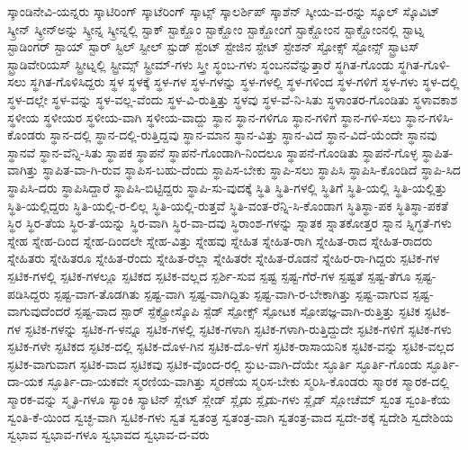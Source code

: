 {ಸ್ಕಾಂಡಿನೇವಿ-ಯನ್ನರು
ಸ್ಕಾಟಿರಿಂಗ್
ಸ್ಕಾಟೆರಿಂಗ್
ಸ್ಕಾಟ್ಸ್
ಸ್ಕಾಲರ್ಶಿಪ್
ಸ್ಕಾಶೆನ್
ಸ್ಕೀಯ-ವ-ರನ್ನು
ಸ್ಕೂಲ್
ಸ್ಕೊವಿಟ್
ಸ್ಕ್ರೀನ್
ಸ್ಕ್ರೀನ್ಅನ್ನು
ಸ್ಕ್ರೀನ್ನ
ಸ್ಕ್ರೀನ್ನಲ್ಲಿ
ಸ್ಟಾಕ್
ಸ್ಟಾಕ್ಹೊಂ
ಸ್ಟಾಕ್ಹೋಂ
ಸ್ಟಾಕ್ಹೋಂಗೆ
ಸ್ಟಾಕ್ಹೋಂನ
ಸ್ಟಾಕ್ಹೋಂನಲ್ಲಿ
ಸ್ಟಾಟ್ನ
ಸ್ಟಾಡಿಂಗರ್
ಸ್ಟಾಯ್
ಸ್ಟಾರ್
ಸ್ಟಿಲ್
ಸ್ಟೀಲ್
ಸ್ಟುಡ್
ಸ್ಟೆಂಟ್
ಸ್ಟೇಜಿನ
ಸ್ಟೇಟ್
ಸ್ಟೇಶನ್
ಸ್ಟೋಕ್ಸ್
ಸ್ಟೋನ್ಸ್
ಸ್ಟ್ರಾಟಸ್
ಸ್ಟ್ರಾಡಿವೇರಿಯಸ್
ಸ್ಟ್ರೀಟ್ನಲ್ಲಿ
ಸ್ಟ್ರೀಮ್ಸ್
ಸ್ಟ್ರೀಮ್-ಗಳು
ಸ್ತ್ರೀ
ಸ್ಥಂಬ-ಗಳು
ಸ್ಥಂಬನವೆನ್ನುತ್ತಾರೆ
ಸ್ಥಗಿತ-ಗೊಂಡು
ಸ್ಥಗಿತ-ಗೊಳಿ-ಸಲು
ಸ್ಥಗಿತ-ಗೊಳಿಸಿದ್ದರು
ಸ್ಥಳ
ಸ್ಥಳಕ್ಕೆ
ಸ್ಥಳ-ಗಳ
ಸ್ಥಳ-ಗಳನ್ನು
ಸ್ಥಳ-ಗಳಲ್ಲಿ
ಸ್ಥಳ-ಗಳಿಂದ
ಸ್ಥಳ-ಗಳಿಗೆ
ಸ್ಥಳ-ಗಳು
ಸ್ಥಳ-ದಲ್ಲಿ
ಸ್ಥಳ-ದಲ್ಲೇ
ಸ್ಥಳ-ವನ್ನು
ಸ್ಥಳ-ವಲ್ಲ-ವೆಂದು
ಸ್ಥಳ-ವಿ-ರುತ್ತಿತ್ತು
ಸ್ಥಳವು
ಸ್ಥಳ-ವೆ-ನಿ-ಸಿತು
ಸ್ಥಳಾಂತರ-ಗೊಂಡಿತು
ಸ್ಥಳಾವಕಾಶ
ಸ್ಥಳೀಯ
ಸ್ಥಳೀಯರ
ಸ್ಥಳೀಯ-ವಾಗಿ
ಸ್ಥಳೀಯ-ವಾದ್ದು
ಸ್ಥಾನ
ಸ್ಥಾನ-ಗಳಿಗೂ
ಸ್ಥಾನ-ಗಳಿಗೆ
ಸ್ಥಾನ-ಗಳಿ-ಸಲು
ಸ್ಥಾನ-ಗಳಿಸಿ-ಕೊಂಡರು
ಸ್ಥಾನ-ದಲ್ಲಿ
ಸ್ಥಾನ-ದಲ್ಲಿ-ರುತ್ತಿದ್ದವು
ಸ್ಥಾನ-ಮಾನ
ಸ್ಥಾನ-ವಿತ್ತು
ಸ್ಥಾನ-ವಿದೆ
ಸ್ಥಾನ-ವಿದೆ-ಯೆಂದೇ
ಸ್ಥಾನವು
ಸ್ಥಾನವೆ
ಸ್ಥಾನ-ವೆನ್ನಿ-ಸಿತು
ಸ್ಥಾಪಕ
ಸ್ಥಾಪನೆ
ಸ್ಥಾಪನೆ-ಗೊಂಡಾಗಿ-ನಿಂದಲೂ
ಸ್ಥಾಪನೆ-ಗೊಂಡಿತು
ಸ್ಥಾಪನೆ-ಗೊಳ್ಳ
ಸ್ಥಾಪಿತ-ವಾಗಿತ್ತು
ಸ್ಥಾಪಿತ-ವಾ-ಗಿ-ರುವ
ಸ್ಥಾಪಿಸ-ಬಹು-ದೆಂದು
ಸ್ಥಾಪಿಸ-ಬೇಕು
ಸ್ಥಾಪಿ-ಸಲು
ಸ್ಥಾಪಿಸಿ
ಸ್ಥಾಪಿಸಿ-ಕೊಂಡಿದೆ
ಸ್ಥಾಪಿ-ಸಿದ
ಸ್ಥಾಪಿಸಿ-ದರು
ಸ್ಥಾಪಿಸಿದ್ದಾರೆ
ಸ್ಥಾಪಿಸಿ-ಬಿಟ್ಟಿದ್ದರು
ಸ್ಥಾಪಿ-ಸು-ವುದಕ್ಕೆ
ಸ್ಥಿತಿ
ಸ್ಥಿತಿ-ಗಳಲ್ಲಿ
ಸ್ಥಿತಿಗೆ
ಸ್ಥಿತಿ-ಯಲ್ಲಿ
ಸ್ಥಿತಿ-ಯಲ್ಲಿತ್ತು
ಸ್ಥಿತಿ-ಯಲ್ಲಿದ್ದರು
ಸ್ಥಿತಿ-ಯಲ್ಲಿ-ರ-ಲಿಲ್ಲ
ಸ್ಥಿತಿ-ಯಲ್ಲಿ-ರುತ್ತವೆ
ಸ್ಥಿತಿ-ವಂತ-ರೆನ್ನಿ-ಸಿ-ಕೊಂಡಾಗ
ಸ್ಥಿತಿಸ್ಥಾ-ಪಕ
ಸ್ಥಿತಿಸ್ಥಾ-ಪಕತೆ
ಸ್ಥಿರ
ಸ್ಥಿರ-ತೆಯ
ಸ್ಥಿರ-ತೆ-ಯನ್ನು
ಸ್ಥಿರ-ವಾಗಿ
ಸ್ಥಿರ-ವಾ-ದವು
ಸ್ಥಿರಾಂಶ-ಗಳನ್ನು
ಸ್ನಾತಕ
ಸ್ನಾತಕೋತ್ತರ
ಸ್ನಾನ
ಸ್ನಿಗ್ಧತೆ-ಗಳು
ಸ್ನೇಹ
ಸ್ನೇಹ-ದಿಂದ
ಸ್ನೇಹ-ದಿಂದಲೇ
ಸ್ನೇಹ-ವಿತ್ತು
ಸ್ನೇಹವು
ಸ್ನೇಹಿತ
ಸ್ನೇಹಿತ-ರಾಗಿ
ಸ್ನೇಹಿತ-ರಾದ
ಸ್ನೇಹಿತ-ರಾದರು
ಸ್ನೇಹಿತರು
ಸ್ನೇಹಿತರೂ
ಸ್ನೇಹಿತ-ರೆಂದು
ಸ್ನೇಹಿತ-ರೆಲ್ಲಾ
ಸ್ನೇಹಿತರೇ
ಸ್ನೇಹಿತ-ರೊಡನೆ
ಸ್ನೇಹಿರ-ರಾ-ಗಿದ್ದರು
ಸ್ಪಟಿಕ-ಗಳ
ಸ್ಪಟಿಕ-ಗಳಲ್ಲಿ
ಸ್ಪಟಿಕ-ಗಳಲ್ಲೂ
ಸ್ಪಟಿಕದ
ಸ್ಪಟಿಕ-ವಲ್ಲದ
ಸ್ಪರ್ಶಿ-ಸುವ
ಸ್ಪಷ್ಟ
ಸ್ಪಷ್ಟ-ಗೆರೆ-ಗಳ
ಸ್ಪಷ್ಟತೆ
ಸ್ಪಷ್ಟ-ತೆಗೂ
ಸ್ಪಷ್ಟ-ಪಡಿಸಿದ್ದರು
ಸ್ಪಷ್ಟ-ವಾಗ-ತೊಡಗಿತು
ಸ್ಪಷ್ಟ-ವಾಗಿ
ಸ್ಪಷ್ಟ-ವಾಗಿದ್ದಿತು
ಸ್ಪಷ್ಟ-ವಾಗಿ-ರ-ಬೇಕಾಗಿತ್ತು
ಸ್ಪಷ್ಟ-ವಾಗುವ
ಸ್ಪಷ್ಟ-ವಾಗುವುದೆಂದರೆ
ಸ್ಪಷ್ಟ-ವಾದ
ಸ್ಪಾರ್
ಸ್ಪೆಕ್ಟ್ರೋಸ್ಕೊಪಿ
ಸ್ಪೆಡ್
ಸ್ಪೋಕ್ಸ್
ಸ್ಪೋಟಕ
ಸ್ಪೋಪಜ್ಞ-ವಾಗಿ-ರುತ್ತಿತ್ತು
ಸ್ಫಟಿಕ
ಸ್ಫಟಿಕ-ಗಳ
ಸ್ಫಟಿಕ-ಗಳನ್ನು
ಸ್ಫಟಿಕ-ಗ-ಳನ್ನೂ
ಸ್ಫಟಿಕ-ಗಳಲ್ಲಿ
ಸ್ಫಟಿಕ-ಗಳಾಗಿ
ಸ್ಫಟಿಕ-ಗಳಾಗಿ-ರುತ್ತಿದ್ದುದೇ
ಸ್ಫಟಿಕ-ಗಳಿಗೆ
ಸ್ಫಟಿಕ-ಗಳು
ಸ್ಫಟಿಕ-ಗಳೇ
ಸ್ಫಟಿಕದ
ಸ್ಫಟಿಕ-ದಲ್ಲಿ
ಸ್ಫಟಿಕ-ದೊಳ-ಗಿನ
ಸ್ಫಟಿಕ-ದೊ-ಳಗೆ
ಸ್ಫಟಿಕ-ರಾಸಾಯನಿಕ
ಸ್ಫಟಿಕ-ವನ್ನು
ಸ್ಫಟಿಕ-ವಲ್ಲದ
ಸ್ಫಟಿಕ-ವಾಗುವಾಗ
ಸ್ಫಟಿಕ-ವಾದ
ಸ್ಫಟಿಕವು
ಸ್ಫಟಿಕ-ವೊಂದ-ರಲ್ಲಿ
ಸ್ಫುಟ-ವಾಗಿ-ದೆಯೇ
ಸ್ಫೂರ್ತಿ
ಸ್ಫೂರ್ತಿ-ಗೊಂಡು
ಸ್ಫೂರ್ತಿ-ದಾ-ಯಕ
ಸ್ಫೂರ್ತಿ-ದಾ-ಯಕವೇ
ಸ್ಮರಣಿಯ-ವಾಗಿತ್ತು
ಸ್ಮರಣೆಯ
ಸ್ಮರಿಸ-ಬೇಕು
ಸ್ಮರಿಸಿ-ಕೊಂಡರು
ಸ್ಮಾರಕ
ಸ್ಮಾರಕ-ದಲ್ಲಿ
ಸ್ಮಾರಕ-ವನ್ನು
ಸ್ಮೃತಿ-ಗಳೂ
ಸ್ಯಾಂಕಿ
ಸ್ಯಾಟಿನ್
ಸ್ಲೇಟ್
ಸ್ಲೇಡ್
ಸ್ಲೈಡು
ಸ್ಲೈಡು-ಗಳು
ಸ್ಲೈಡ್
ಸ್ಲೋಚೆಮ್
ಸ್ವಂತ
ಸ್ವಂತಿ-ಕೆಯ
ಸ್ವಂತಿ-ಕೆ-ಯಿಂದ
ಸ್ವಚ್ಛ-ವಾಗಿ
ಸ್ವಟಿಕ-ಗಳು
ಸ್ವತ
ಸ್ವತಂತ್ರ
ಸ್ವತಂತ್ರ-ವಾಗಿ
ಸ್ವತಂತ್ರ-ವಾದ
ಸ್ವದೇ-ಶಕ್ಕೆ
ಸ್ವದೇಶಿ
ಸ್ವದೇಶಿಯ
ಸ್ವಭಾವ
ಸ್ವಭಾವ-ಗಳೂ
ಸ್ವಭಾವದ
ಸ್ವಭಾವ-ದ-ವರು
}
